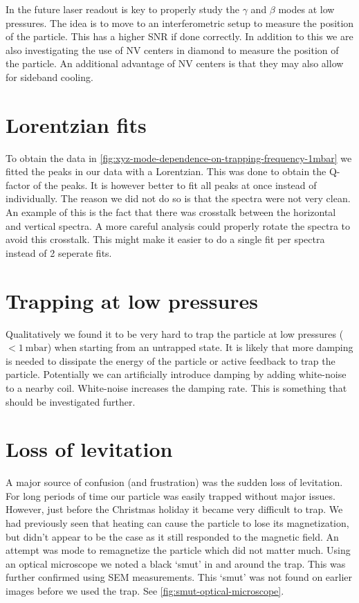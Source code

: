 In the future laser readout is key to properly study the $\gamma$ and $\beta$ modes at low pressures. The idea is to move to an interferometric setup to measure the position of the particle. This has a higher SNR if done correctly. In addition to this we are also investigating the use of NV centers in diamond to measure the position of the particle. An additional advantage of NV centers is that they may also allow for sideband cooling.

\section*{Lorentzian fits}
To obtain the data in \autoref{fig:xyz-mode-dependence-on-trapping-frequency-1mbar} we fitted the peaks in our data with a Lorentzian. This was done to obtain the Q-factor of the peaks. It is however better to fit all peaks at once instead of individually. The reason we did not do so is that the spectra were not very clean. An example of this is the fact that there was crosstalk between the horizontal and vertical spectra. A more careful analysis could properly rotate the spectra to avoid this crosstalk. This might make it easier to do a single fit per spectra instead of 2 seperate fits.

\section*{Trapping at low pressures}
Qualitatively we found it to be very hard to trap the particle at low pressures ($<\qty{1}{\milli\bar}$) when starting from an untrapped state. It is likely that more damping is needed to dissipate the energy of the particle or active feedback to trap the particle. Potentially we can artificially introduce damping by adding white-noise to a nearby coil. White-noise increases the damping rate\cite{millen}. This is something that should be investigated further.

\section*{Loss of levitation}
A major source of confusion (and frustration) was the sudden loss of levitation. For long periods of time our particle was easily trapped without major issues. However, just before the Christmas holiday it became very difficult to trap. We had previously seen that heating can cause the particle to lose its magnetization, but didn't appear to be the case as it still responded to the magnetic field. An attempt was mode to remagnetize the particle which did not matter much. Using an optical microscope we noted a black `smut' in and around the trap. This was further confirmed using SEM measurements. This `smut' was not found on earlier images before we used the trap. See \autoref{fig:smut-optical-microscope}.

